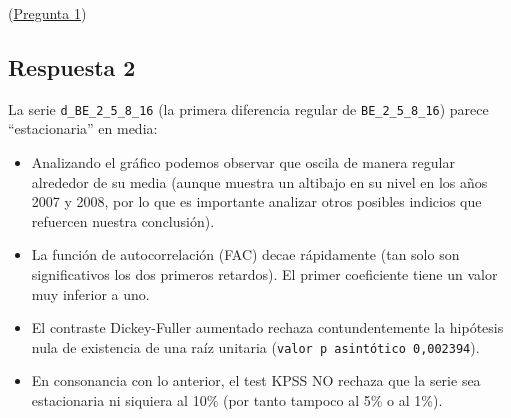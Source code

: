 \documentclass[10pt]{article}
\begin{document}
(\hyperref[sec:org493afb9]{Pregunta 1})
\subsection*{Respuesta 2}
\label{sec:org4e26b41}

La serie \texttt{d\_BE\_2\_5\_8\_16} (la primera diferencia regular de
\texttt{BE\_2\_5\_8\_16}) parece ``estacionaria'' en media:
\begin{itemize}
\item Analizando el gráfico podemos observar que oscila de manera regular
alrededor de su media (aunque muestra un altibajo en su nivel en los
años 2007 y 2008, por lo que es importante analizar otros posibles
indicios que refuercen nuestra conclusión).

\item La función de autocorrelación (FAC) decae rápidamente (tan solo son
significativos los dos primeros retardos). El primer coeficiente
tiene un valor muy inferior a uno.

\item El contraste Dickey-Fuller aumentado rechaza contundentemente la
hipótesis nula de existencia de una raíz unitaria (\texttt{valor p
  asintótico 0,002394}).

\item En consonancia con lo anterior, el test KPSS NO rechaza que la serie
sea estacionaria ni siquiera al 10\% (por tanto tampoco al 5\% o al
1\%).
\end{itemize}
\end{document}
